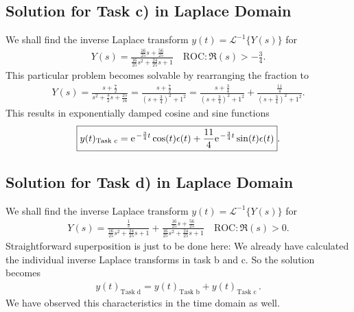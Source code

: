 \documentclass[a4paper,11pt,oneside]{scrartcl}
\begin{document}
\subsection{Solution for Task c) in Laplace Domain}
We shall find the inverse Laplace transform $y(t) = \mathcal{L}^{-1}\{Y(s)\}$
for
\begin{align}
Y(s) =
\frac{\frac{16}{25} s + \frac{56}{25}}{\frac{16}{25} s^2 + \frac{24}{25} s + 1}
\quad \text{ROC}: \Re(s) > -\frac{3}{4}.
\end{align}
This particular problem becomes solvable by rearranging the fraction to
\begin{align}
Y(s) =
\frac{s + \frac{7}{2}}{s^2 + \frac{3}{2} s + \frac{25}{16}} =
\frac{s + \frac{7}{2}}{(s + \frac{3}{4})^2 + 1^2}
=\frac{s + \frac{3}{4}}{(s + \frac{3}{4})^2 + 1^2}
+\frac{\frac{11}{4}}{(s + \frac{3}{4})^2 + 1^2}.
\end{align}
This results in exponentially damped cosine and sine functions
\begin{align}
\boxed{y(t)_\text{Task c} =
\e^{-\frac{3}{4} t} \cos(t) \epsilon(t)
+\frac{11}{4}\e^{-\frac{3}{4} t} \sin(t) \epsilon(t)}.
\end{align}


\subsection{Solution for Task d) in Laplace Domain}
We shall find the inverse Laplace transform $y(t) = \mathcal{L}^{-1}\{Y(s)\}$
for
\begin{align}
Y(s) = \frac{\frac{1}{s}}{\frac{16}{25} s^2 + \frac{24}{25} s + 1}+
\frac{\frac{16}{25} s + \frac{56}{25}}{\frac{16}{25} s^2 + \frac{24}{25} s + 1}
\quad \text{ROC}: \Re(s) > 0.
\end{align}
Straightforward superposition is just to be done here:
We already have calculated the individual inverse Laplace transforms in task b
and c. So the solution becomes
\begin{align}
\boxed{y(t)_\text{Task d} = y(t)_\text{Task b} + y(t)_\text{Task c}
}\,.
\end{align}
We have observed this characteristics in the time domain as well.


\end{document}
